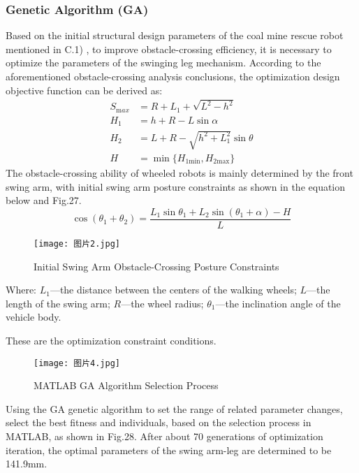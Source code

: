 \documentclass[conference]{IEEEtran}
\begin{document}
\subsubsection{Genetic Algorithm (GA)}
Based on the initial structural design parameters of the coal mine rescue robot mentioned in C.1) \cite{b32}, to improve obstacle-crossing efficiency, it is necessary to optimize the parameters of the swinging leg mechanism. According to the aforementioned obstacle-crossing analysis conclusions, the optimization design objective function can be derived as:
\begin{align*}
    S_{\mathrm max} & = R + L_1 + \sqrt{L^2-h^2}\\
    H_1 & = h + R -L\sin{\alpha}\\
    H_2 & = L + R - \sqrt{h^2+L_1^2}\sin\theta\\
    H & = \min\Big\{H_{1\mathrm{min}},H_{2\mathrm{max}}\Big\}
\end{align*}
The obstacle-crossing ability of wheeled robots is mainly determined by the front swing arm, with initial swing arm posture constraints as shown in the equation below and Fig.27.
$$\cos(\theta_1+\theta_2)=\frac{L_1\sin\theta_1+L_2\sin(\theta_1+\alpha)-H}{L}$$
\begin{figure}[h]
    \centering
    \texttt{[image: 图片2.jpg]}
    \caption{Initial Swing Arm Obstacle-Crossing Posture Constraints}
    \label{fig:enter-label}
\end{figure}
Where: $L_1$—the distance between the centers of the walking wheels; $L$—the length of the swing arm; $R$—the wheel radius; $\theta_1$—the inclination angle of the vehicle body.

These are the optimization constraint conditions.

\begin{figure}[h]
    \centering
    \texttt{[image: 图片4.jpg]}
    \caption{MATLAB GA Algorithm Selection Process}
    \label{fig:enter-label}
\end{figure}

Using the GA genetic algorithm to set the range of related parameter changes, select the best fitness and individuals, based on the selection process in MATLAB, as shown in Fig.28. After about 70 generations of optimization iteration, the optimal parameters of the swing arm-leg are determined to be 141.9mm.
\end{document}
